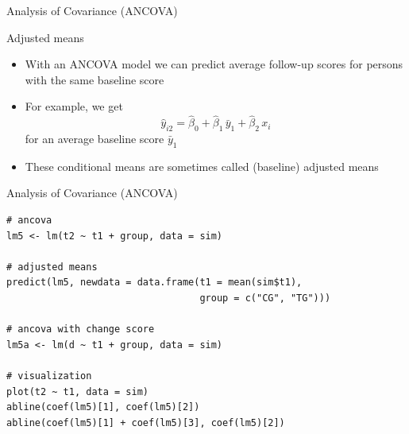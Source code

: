\documentclass[aspectratio=169]{beamer}
\begin{document}
\begin{frame}{Analysis of Covariance (ANCOVA)}
\begin{center}
\end{center}
\end{frame}


\begin{frame}{Adjusted means}
\begin{itemize}
  \item With an ANCOVA model we can predict average follow-up scores for
    persons with the same baseline score
  \item For example, we get
    \[
      \hat{y}_{i2} = \hat{\beta}_0 + \hat{\beta}_1 \, \bar{y}_1 +
                     \hat{\beta}_2 \, x_i
    \]
    for an average baseline score $\bar{y}_1$
\item These conditional means are sometimes called (baseline) adjusted
  means
\end{itemize}
\end{frame}

\begin{frame}[fragile]{Analysis of Covariance (ANCOVA)}
\begin{lstlisting}
# ancova
lm5 <- lm(t2 ~ t1 + group, data = sim)

# adjusted means
predict(lm5, newdata = data.frame(t1 = mean(sim$t1),
                                  group = c("CG", "TG")))

# ancova with change score
lm5a <- lm(d ~ t1 + group, data = sim)

# visualization
plot(t2 ~ t1, data = sim)
abline(coef(lm5)[1], coef(lm5)[2])
abline(coef(lm5)[1] + coef(lm5)[3], coef(lm5)[2])
\end{lstlisting}
\end{frame}
\end{document}
